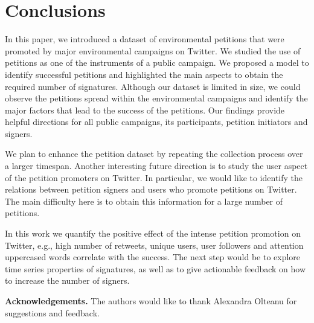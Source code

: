 \section{Conclusions}
In this paper, we introduced a dataset of environmental petitions that were promoted by major environmental campaigns on Twitter.
We studied the use of petitions as one of the instruments of a public campaign.
We proposed a model to identify successful petitions and highlighted the main aspects to obtain the required number of signatures.
Although our dataset is limited in size, we could observe the petitions spread within the environmental campaigns and identify the major factors that lead to the success of the petitions.
Our findings provide helpful directions for all public campaigns, its participants, petition initiators and signers.

We plan to enhance the petition dataset by repeating the collection process over a larger timespan.
Another interesting future direction is to study the user aspect of the petition promoters on Twitter. In particular, we would like to identify the relations between petition signers and users who promote petitions on Twitter. The main difficulty here is to obtain this information for a large number of petitions.

In this work we quantify the positive effect of the intense petition promotion on Twitter, e.g., high number of retweets, unique users, user followers and attention uppercased words correlate with the success.
The next step would be to explore time series properties of signatures, as well as to give actionable feedback on how to increase the number of signers.

\noindent \textbf{Acknowledgements.} The authors would like to thank Alexandra Olteanu for suggestions and feedback.
